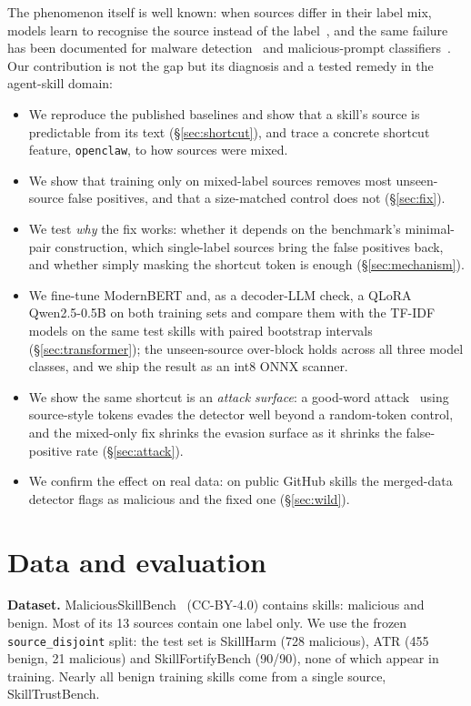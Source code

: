 \documentclass[conference]{IEEEtran}
\begin{document}
The phenomenon itself is well known: when sources differ in their label mix, models learn to recognise the
source instead of the label~\cite{torralba2011,gururangan2018,geirhos2020,zech2018,compton2023}, and the same
failure has been documented for malware detection~\cite{arp2022} and malicious-prompt
classifiers~\cite{fomin2026}. Our contribution is not the gap but its diagnosis and a tested remedy in the
agent-skill domain:
\begin{itemize}
\item We reproduce the published baselines and show that a skill's source is predictable from its text
(\S\ref{sec:shortcut}), and trace a concrete shortcut feature, \texttt{openclaw}, to how sources were mixed.
\item We show that training only on mixed-label sources removes most unseen-source false positives, and that a
size-matched control does not (\S\ref{sec:fix}).
\item We test \emph{why} the fix works: whether it depends on the benchmark's minimal-pair construction,
which single-label sources bring the false positives back, and whether simply masking the shortcut token is
enough (\S\ref{sec:mechanism}).
\item We fine-tune ModernBERT and, as a decoder-LLM check, a QLoRA Qwen2.5-0.5B on both training sets and
compare them with the TF-IDF models on the same test skills with paired bootstrap intervals
(\S\ref{sec:transformer}); the unseen-source over-block holds across all three model classes, and we ship
the result as an int8 ONNX scanner.
\item We show the same shortcut is an \emph{attack surface}: a good-word attack~\cite{lowd2005} using
source-style tokens evades the detector well beyond a random-token control, and the mixed-only fix
shrinks the evasion surface as it shrinks the false-positive rate (\S\ref{sec:attack}).
\item We confirm the effect on real data: on \WildN{} public GitHub skills the merged-data detector
flags \WildFlaggedAll{} as malicious and the fixed one \WildFlaggedMixed{} (\S\ref{sec:wild}).
\end{itemize}

\section{Data and evaluation}
\label{sec:data}
\textbf{Dataset.} MaliciousSkillBench~\cite{msb2026} (CC-BY-4.0) contains \DataSkills{} skills:
\DataMalicious{} malicious and \DataBenign{} benign. Most of its 13 sources contain one label only.
We use the frozen \texttt{source\_disjoint} split: the test set is SkillHarm (728 malicious), ATR (455 benign,
21 malicious) and SkillFortifyBench (90/90), none of which appear in training. Nearly all benign training
skills come from a single source, SkillTrustBench.
\end{document}
